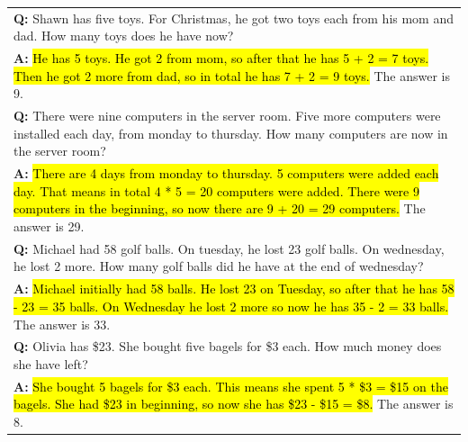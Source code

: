 \begin{table}[H]
\begin{tabular}{p{\linewidth}}
        \vspace{0mm}
        \textbf{Q:} Shawn has five toys. For Christmas, he got two toys each from his mom and dad. How many toys does he have now? \\
        \vspace{-1mm}
        \textbf{A:} \hl{He has 5 toys. He got 2 from mom, so after that he has 5 + 2 = 7 toys. Then he got 2 more from dad, so in total he has 7 + 2 = 9 toys.} The answer is 9. \\
        \vspace{0mm}
        \textbf{Q:} There were nine computers in the server room. Five more computers were installed each day, from monday to thursday. How many computers are now in the server room? \\
        \vspace{-1mm}
        \textbf{A:} \hl{There are 4 days from monday to thursday. 5 computers were added each day. That means in total 4 * 5 = 20 computers were added. There were 9 computers in the beginning, so now there are 9 + 20 = 29 computers.} The answer is 29. \\
        \vspace{0mm}
        \textbf{Q:} Michael had 58 golf balls. On tuesday, he lost 23 golf balls. On wednesday, he lost 2 more. How many golf balls did he have at the end of wednesday? \\
        \vspace{-1mm}
        \textbf{A:} \hl{Michael initially had 58 balls. He lost 23 on Tuesday, so after that he has 58 - 23 = 35 balls. On Wednesday he lost 2 more so now he has 35 - 2 = 33 balls.} The answer is 33. \\
        \vspace{0mm}
        \textbf{Q:} Olivia has \$23. She bought five bagels for \$3 each. How much money does she have left? \\
        \vspace{-1mm}
        \textbf{A:} \hl{She bought 5 bagels for \$3 each. This means she spent 5 * \$3 = \$15 on the bagels. She had \$23 in beginning, so now she has \$23 - \$15 = \$8.} The answer is 8. \\
        \bottomrule
    \end{tabular}
    \label{tab:appendix-mwp-prompts-alt-b}
\end{table}
\endgroup